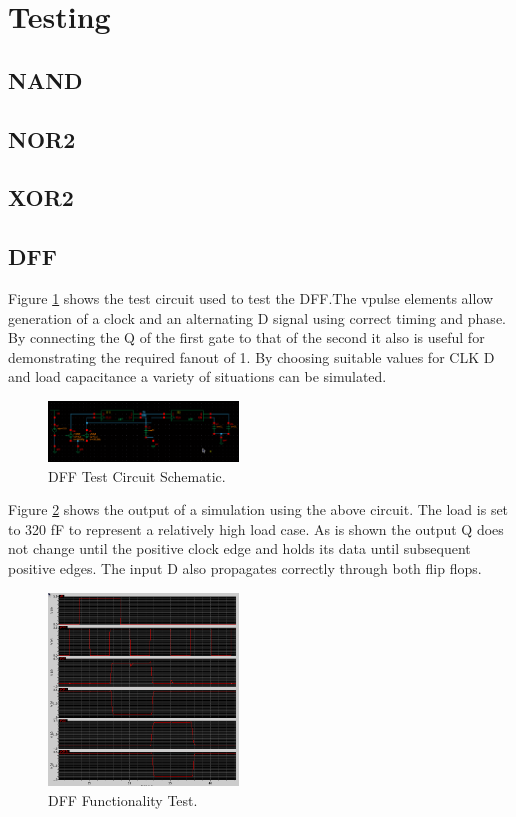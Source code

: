 \section{Testing}


\subsection{NAND}

\subsection{NOR2}

\subsection{XOR2}

\subsection{DFF}

Figure \ref{fig:DFFTestSchem} shows the test circuit used to test the DFF.The vpulse elements allow generation of a clock and an alternating D signal using correct timing and phase. By connecting the Q of the first gate to that of the second it also is useful for demonstrating the required fanout of 1. By choosing suitable values for CLK D and load capacitance a variety of situations can be simulated.

\begin{figure}[h]  
\centering
   \includegraphics[width=0.45\textwidth]{Figures/DFFTestSchem.png}
\caption{DFF Test Circuit Schematic.}
\label {fig:DFFTestSchem}
\end{figure}

Figure \ref{fig:DFFTestFunc} shows the output of a simulation using the above circuit. The load is set to 320 fF to represent a relatively high load case. As is shown the output Q does not change until the positive clock edge and holds its data until subsequent positive edges. The input D also propagates correctly through both flip flops.

\begin{figure}[h]  
\centering
   \includegraphics[width=0.45\textwidth]{Figures/DFFTestFunc.png}
\caption{DFF Functionality Test.}
\label {fig:DFFTestFunc}
\end{figure}

